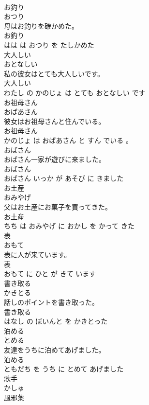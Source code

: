 \documentclass[8pt]{extreport}
\begin{document}
\begin{CJK}{UTF8}{min}
\\	お釣り	
\\	おつり			
\\	母はお釣りを確かめた。	
\\	お釣り 
\\	はは は おつり を たしかめた			
\\	大人しい	
\\	おとなしい			
\\	私の彼女はとても大人しいです。	
\\	大人しい 
\\	わたし の かのじょ は とても おとなしい です			
\\	お祖母さん	
\\	おばあさん			
\\	彼女はお祖母さんと住んでいる。	
\\	お祖母さん 
\\	かのじょ は おばあさん と すん でいる 。			
\\	おばさん	
\\	おばさん一家が遊びに来ました。	
\\	おばさん 
\\	おばさん いっか が あそび に きました			
\\	お土産	
\\	おみやげ			
\\	父はお土産にお菓子を買ってきた。	
\\	お土産 
\\	ちち は おみやげ に おかし を かって きた			
\\	表	
\\	おもて			
\\	表に人が来ています。	
\\	表 
\\	おもて に ひと が きて います			
\\	書き取る	
\\	かきとる			
\\	話しのポイントを書き取った。	
\\	書き取る 
\\	はなし の ぽいんと を かきとった			
\\	泊める	
\\	とめる			
\\	友達をうちに泊めてあげました。	
\\	泊める 
\\	ともだち を うち に とめて あげました			
\\	歌手	
\\	かしゅ			
\\	風邪薬	

\end{CJK}
\end{document}
